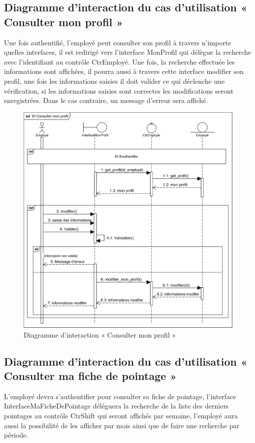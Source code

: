 \begin{itemize}
    \subsection*{Diagramme d'interaction du cas d'utilisation « Consulter mon profil »}
    Une fois authentifié, l’employé peut consulter son profil à travers n’importe quelles interfaces, il est redirigé vers l’interface MonProfil qui délègue la recherche avec l’identifiant au contrôle CtrEmployé. Une fois, la recherche effectuée les informations sont affichées, il pourra aussi à travers cette interface modifier son profil, une fois les informations saisies il doit valider ce qui déclenche une vérification, si les informations saisies sont correctes les modifications seront enregistrées. Dans le cas contraire, un message d’erreur sera affiché.
        \begin{figure}[h!]
                 \centering
                \includegraphics[scale=0.86]{images/DS/consulter_mon_profile}
                 \caption{Diagramme d'interaction « Consulter mon profil »}
                 \label{fig35}
        \end{figure}
    \clearpage
    
        \subsection*{Diagramme d'interaction du cas d'utilisation « Consulter ma fiche de pointage »}
        L’employé devra s’authentifier pour consulter sa fiche de pointage, l’interface InterfaceMaFicheDePointage déléguera la recherche de la liste des derniers pointages au contrôle CtrShift qui seront affichés par semaine, l’employé aura aussi la possibilité de les afficher par mois ainsi que de faire une recherche par période. 
        

\end{itemize}
